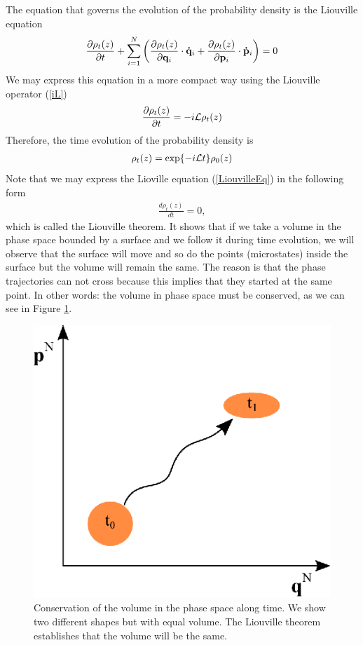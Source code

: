 \documentclass[a4paper,openright,12pt]{book}
\begin{document}
The equation that governs the evolution of the probability density is the Liouville equation
\begin{equation}
    \frac{\partial\rho_t(z)}{\partial t} + \sum_{i=1}^N\left(\frac{\partial\rho_t(z)}{\partial{\bf q}_i}\cdot{\bf \dot{q}}_i+\frac{\partial\rho_t(z)}{\partial{\bf p}_i}\cdot{\bf \dot{p}}_i\right) = 0
\end{equation}
We may express this equation in a more compact way using the Liouville operator (\ref{iL}) 
\begin{align}
    \frac{\partial\rho_t(z)}{\partial t} = -i{\cal L}\rho_t(z)
  \label{LiouvilleEq}
\end{align}
Therefore, the time evolution of the probability density is
\begin{align}
    \rho_t(z) = {\rm exp}\{-i{\cal L}t\}\rho_0(z)
    \label{rhot}
\end{align}
Note that we may express the Lioville equation (\ref{LiouvilleEq}) in the following form
\begin{align}
    \frac{d\rho_t(z)}{dt} = 0 ,
    \label{LiouvilleTh}
\end{align}
which is called the Liouville theorem. It shows that if we take a volume in the phase space bounded by a surface and we follow it during time evolution, we will observe that the surface will move and so do the points (microstates) inside the surface but the volume will remain the same. The reason is that the phase trajectories can not cross because this implies that they started at the same point. In other words: the volume in phase space must be conserved, as we can see in Figure \ref{fig:LiouvilleTh}.

\begin{figure}
    \centering
    \includegraphics[scale=0.9]{Liouville}
    \caption[The Liouville theorem]{Conservation of the volume in the phase space along time. We show two different shapes but with equal volume. The Liouville theorem establishes that the volume will be the same.}
    \label{fig:LiouvilleTh}
\end{figure}
\end{document}
